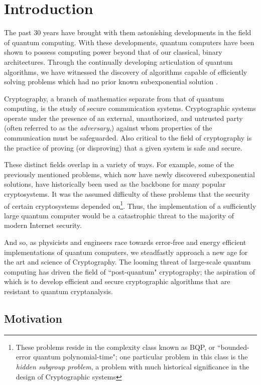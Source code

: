 \chapter{Introduction}

The past 30 years have brought with them astonishing developments in the field of quantum computing. With these developments, quantum computers have been shown to possess computing power beyond that of our classical, binary architectures. Through the continually developing articulation of quantum algorithms, we have witnessed the discovery of algorithms capable of efficiently solving problems which had no prior known subexponential solution \cite{shor}. 

Cryptography, a branch of mathematics separate from that of quantum computing, is the study of secure communication systems. Cryptographic systems operate under the presence of an external, unauthorized, and untrusted party (often referred to as the \textit{adversary},) against whom properties of the communication must be safeguarded. Also critical to the field of cryptography is the practice of proving (or disproving) that a given system is safe and secure.

These distinct fields overlap in a variety of ways. For example, some of the previously mentioned problems, which now have newly discovered subexponential solutions, have historically been used as the backbone for many popular cryptosystems. It was the assumed difficulty of these problems that the security of certain cryptosystems depended on\footnote{These problems reside in the complexity class known as BQP, or ``bounded-error quantum polynomial-time"; one particular problem in this class is the \textit{hidden subgroup problem}, a problem with much historical significance in the design of Cryptographic systems}. Thus, the implementation of a sufficiently large quantum computer would be a catastrophic threat to the majority of modern Internet security.  

And so, as physicists and engineers race towards error-free and energy efficient implementations of quantum computers, we steadfastly approach a new age for the art and science of Cryptography. The looming threat of large-scale quantum computing has driven the field of ``post-quantum" cryptography; the aspiration of which is to develop efficient and secure cryptographic algorithms that are resistant to quantum cryptanalysis.\\

\section{Motivation}
\label{sec:motivation}

